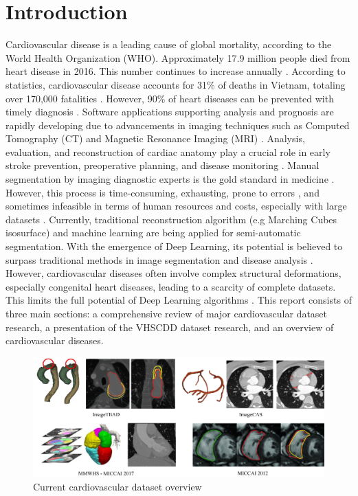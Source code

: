 \documentclass{article}
\begin{document}
\section{Introduction}
Cardiovascular disease is a leading cause of global mortality, according to the World Health Organization (WHO). Approximately 17.9 million people died from heart disease in 2016. This number continues to increase annually \cite{deep_review}. According to statistics, cardiovascular disease accounts for 31\% of deaths in Vietnam, totaling over 170,000 fatalities \cite{stanford}. However, 90\% of heart diseases can be prevented with timely diagnosis \cite{quantification, prevent}. Software applications supporting analysis and prognosis are rapidly developing due to advancements in imaging techniques such as Computed Tomography (CT) and Magnetic Resonance Imaging (MRI) \cite{contour}. Analysis, evaluation, and reconstruction of cardiac anatomy play a crucial role in early stroke prevention, preoperative planning, and disease monitoring \cite{short_axis, left_ventricle, right_ventricle}. Manual segmentation by imaging diagnostic experts is the gold standard in medicine \cite{left_ventricle}. However, this process is time-consuming, exhausting, prone to errors \cite{quantification, tran}, and sometimes infeasible in terms of human resources and costs, especially with large datasets \cite{medical_image}. Currently, traditional reconstruction algorithm (e.g Marching Cubes isosurface) and machine learning are being applied for semi-automatic segmentation. With the emergence of Deep Learning, its potential is believed to surpass traditional methods in image segmentation and disease analysis \cite{deep_review}. However, cardiovascular diseases often involve complex structural deformations, especially congenital heart diseases, leading to a scarcity of complete datasets. This limits the full potential of Deep Learning algorithms \cite{left_ventricle}. This report consists of three main sections: a comprehensive review of major cardiovascular dataset research, a presentation of the VHSCDD dataset research, and an overview of cardiovascular diseases.

\begin{figure}
    \centering
    \includegraphics[width=1\textwidth]{figures/review.png}
    \caption{Current cardiovascular dataset overview}
    \label{fig:1}
\end{figure}
\end{document}
